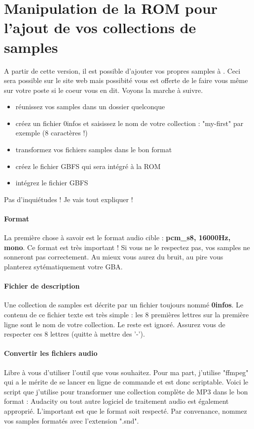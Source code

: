 \documentclass[12pt,a4paper]{article}
\begin{document}
  \section{Manipulation de la ROM pour l'ajout de vos collections de samples}

  A partir de cette version, il est possible d'ajouter vos propres samples à \FAT. Ceci sera possible sur le site web mais possibité vous est offerte de le faire vous même sur votre poste si le coeur vous en dit.
  Voyons la marche à suivre.\medskip

    \begin{itemize}
      \item{réunissez vos samples dans un dossier quelconque}
      \item{créez un fichier 0infos et saisissez le nom de votre collection : "my-first" par exemple (8 caractères !) }
      \item{transformez vos fichiers samples dans le bon format}
      \item{créez le fichier GBFS qui sera intégré à la ROM}
      \item{intégrez le fichier GBFS}
    \end{itemize}

  Pas d'inquiétudes ! Je vais tout expliquer !

  \paragraph{Format} La première chose à savoir est le format audio cible : {\bf pcm\_s8, 16000Hz, mono}. Ce format est très important ! Si vous ne le respectez pas, vos samples ne sonneront pas correctement. Au mieux vous aurez du bruit, au pire vous planterez sytématiquement votre GBA.

  \paragraph{Fichier de description} Une collection de samples est décrite par un fichier toujours nommé {\bf 0infos}. Le contenu de ce fichier texte est très simple : les 8 premières lettres sur la première ligne sont le nom de votre collection. Le reste est ignoré. Assurez vous de respecter ces 8 lettres (quitte à mettre des '-').

  \paragraph{Convertir les fichiers audio} Libre à vous d'utiliser l'outil que vous souhaitez. Pour ma part, j'utilise "ffmpeg" qui a le mérite de se lancer en ligne de commande et est donc scriptable. Voici le script que j'utilise pour transformer une collection complète de MP3 dans le bon format :
  Audacity ou tout autre logiciel de traitement audio est également approprié. L'important est que le format soit respecté. Par convenance, nommez vos samples formatés avec l'extension ".snd".
\end{document}
